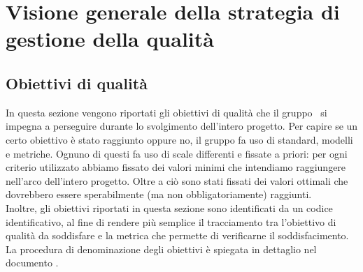 \documentclass[../PianoDiQualifica.tex]{subfiles}
\begin{document}
\section{Visione generale della strategia di gestione della qualità}
	\subsection{Obiettivi di qualità}
	In questa sezione vengono riportati gli obiettivi di qualità che il gruppo \leaf\ si impegna a perseguire durante lo svolgimento dell'intero progetto. Per capire se un certo obiettivo è stato raggiunto oppure no, il gruppo fa uso di standard, modelli e metriche. Ognuno di questi fa uso di scale differenti e fissate a priori: per ogni criterio utilizzato abbiamo fissato dei valori minimi che intendiamo raggiungere nell'arco dell'intero progetto. Oltre a ciò sono stati fissati dei valori ottimali che dovrebbero essere sperabilmente (ma non obbligatoriamente) raggiunti.\\
	Inoltre, gli obiettivi riportati in questa sezione sono identificati da un codice identificativo, al fine di rendere più semplice il tracciamento tra l'obiettivo di qualità da soddisfare e la metrica che permette di verificarne il soddisfacimento.\\
	La procedura di denominazione degli obiettivi è spiegata in dettaglio nel documento \normediprogettov.
	
\end{document}
